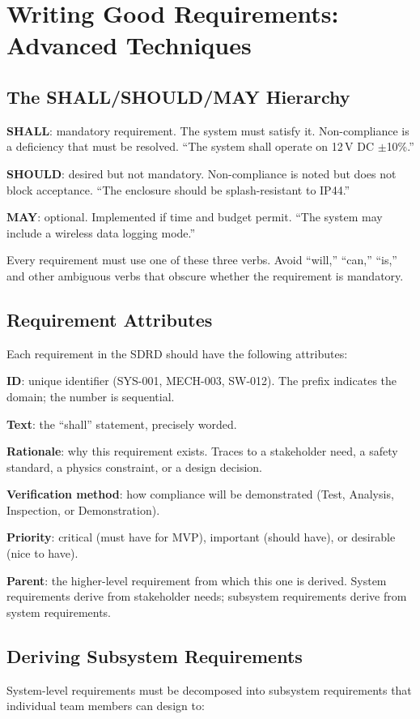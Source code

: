 \section{Writing Good Requirements: Advanced Techniques}
\subsection{The SHALL/SHOULD/MAY Hierarchy}
\textbf{SHALL}: mandatory requirement. The system must satisfy it. Non-compliance is a deficiency that must be resolved. ``The system shall operate on 12\,V DC $\pm$10\%.''

\textbf{SHOULD}: desired but not mandatory. Non-compliance is noted but does not block acceptance. ``The enclosure should be splash-resistant to IP44.''

\textbf{MAY}: optional. Implemented if time and budget permit. ``The system may include a wireless data logging mode.''

Every requirement must use one of these three verbs. Avoid ``will,'' ``can,'' ``is,'' and other ambiguous verbs that obscure whether the requirement is mandatory.

\subsection{Requirement Attributes}
Each requirement in the SDRD should have the following attributes:

\textbf{ID}: unique identifier (SYS-001, MECH-003, SW-012). The prefix indicates the domain; the number is sequential.

\textbf{Text}: the ``shall'' statement, precisely worded.

\textbf{Rationale}: why this requirement exists. Traces to a stakeholder need, a safety standard, a physics constraint, or a design decision.

\textbf{Verification method}: how compliance will be demonstrated (Test, Analysis, Inspection, or Demonstration).

\textbf{Priority}: critical (must have for MVP), important (should have), or desirable (nice to have).

\textbf{Parent}: the higher-level requirement from which this one is derived. System requirements derive from stakeholder needs; subsystem requirements derive from system requirements.

\subsection{Deriving Subsystem Requirements}
System-level requirements must be decomposed into subsystem requirements that individual team members can design to:

